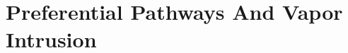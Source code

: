 \documentclass[../thesis.tex]{subfiles}
\begin{document}
\chapter{Preferential Pathways And Vapor Intrusion}

\begin{abstract}

\end{abstract}





\begin{comment}

Main point of this chapter:

Demonstrate how and why subsurface preferential pathways can have such a significant effect on VI.

Outline:

Introduction:
* How did we come to find out about PP?
* Why should we care about them? I.e. what are the issues?
* How do they work?

Methods:
* How do we model the PP?
* How do we do the Kriging interpolation?

Results & Discussion:

* Show how the model predicts the VI at the ASU house. (Main case)
* Turn on and off the enhanced advective potential and contaminant availability to show their contributions.
* Some other factors that affect PP "performance" in the main case. I.e. effect of gravel sub-base.


Conclusion:
* PPs need to enhance advective transport and introduce extra contaminants to be impactful (plus other factors). How common place these combination of factors are determine the concern for PPs.
* Suggestions for how to deal/uncover PPs? Follow Danish recommendations. See if subsurface piping may be discovered a priori. Sample nearby manholes (likely to play some role). Might even use CPM.

\end{comment}
\end{document}
